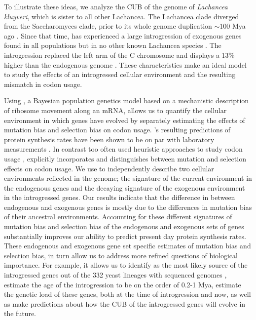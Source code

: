 \documentclass[fleqn,letterpaper]{article}
\begin{document}
To illustrate these ideas, we analyze the CUB of the genome of \emph{Lachancea kluyveri}, which is sister to all other Lachancea.
The Lachancea clade diverged from the Saccharomyces clade, prior to its whole genome duplication $\sim 100$ Mya ago \citep{MHM2015,Beimforde2014}.
Since that time, \kluyveri has experienced a large introgression of exogenous genes found in all populations \citep{friedrich2015} but in no other known Lachancea species \citep{vakirlis2016}.
The introgression replaced the left arm of the C chromosome and displays a $13 \%$ higher \GC than the endogenous \kluyveri genome \citep{payen2009, friedrich2015}.
These characteristics make \kluyveri an ideal model to study the effects of an introgressed cellular environment and the resulting mismatch in codon usage.

Using \ROC, a Bayesian population genetics model based on a mechanistic description of ribosome movement along an mRNA, allows us to quantify the cellular environment in which genes have evolved by separately estimating the effects of mutation bias and selection bias on codon usage.
\ROC's resulting predictions of protein synthesis rates have been shown to be on par with laboratory measurements \citep{ShahAndGilchrist2011, gilchrist2015}.
In contrast too often used heuristic approaches to study codon usage \citep{sharp1987, dosreis2004}, \ROC explicitly incorporates and distinguishes between mutation and selection effects on codon usage.
We use \ROC to independently describe two cellular environments reflected in the \kluyveri genome; the signature of the current environment in the endogenous genes and the decaying signature of the exogenous environment in the introgressed genes.
Our results indicate that the difference in \GC between endogenous and exogenous genes is mostly due to the differences in mutation bias of their ancestral environments.
Accounting for these different signatures of mutation bias and selection bias of the endogenous and exogenous sets of genes substantially improves our ability to predict present day protein synthesis rates.
These endogenous and exogenous gene set specific estimates of mutation bias and selection bias, in turn allow us to address more refined questions of biological importance.
For example, it allows us to identify \gossypii as the most likely source of the introgressed genes out of the 332 yeast lineages with sequenced genomes \citep{shen2018}, estimate the age of the introgression to be on the order of 0.2-1 Mya, estimate the genetic load of these genes, both at the time of introgression and now, as well as make predictions about how the CUB of the introgressed genes will evolve in the future.
\end{document}

